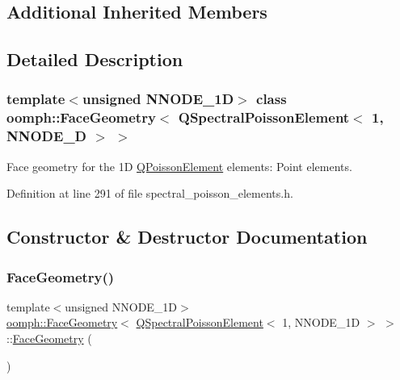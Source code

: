 \subsection*{Additional Inherited Members}


\subsection{Detailed Description}
\subsubsection*{template$<$unsigned N\+N\+O\+D\+E\+\_\+1D$>$\newline
class oomph\+::\+Face\+Geometry$<$ Q\+Spectral\+Poisson\+Element$<$ 1, N\+N\+O\+D\+E\+\_\+D $>$ $>$}

Face geometry for the 1D \hyperlink{classoomph_1_1QPoissonElement}{Q\+Poisson\+Element} elements\+: Point elements. 

Definition at line 291 of file spectral\+\_\+poisson\+\_\+elements.\+h.



\subsection{Constructor \& Destructor Documentation}
\mbox{\label{classoomph_1_1FaceGeometry_3_01QSpectralPoissonElement_3_011_00_01NNODE__1D_01_4_01_4_a3b8269193296e7a366f3d077443379be}} 
\subsubsection{\texorpdfstring{Face\+Geometry()}{FaceGeometry()}}
{\footnotesize\ttfamily template$<$unsigned N\+N\+O\+D\+E\+\_\+1D$>$ \\
\hyperlink{classoomph_1_1FaceGeometry}{oomph\+::\+Face\+Geometry}$<$ \hyperlink{classoomph_1_1QSpectralPoissonElement}{Q\+Spectral\+Poisson\+Element}$<$ 1, N\+N\+O\+D\+E\+\_\+1D $>$ $>$\+::\hyperlink{classoomph_1_1FaceGeometry}{Face\+Geometry} (\begin{DoxyParamCaption}{ }\end{DoxyParamCaption})\hspace{0.3cm}{\ttfamily [inline]}}



